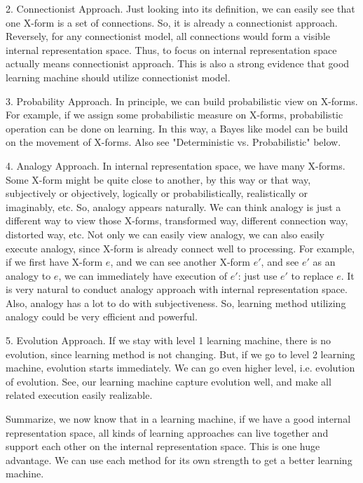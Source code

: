 2. Connectionist Approach.
Just looking into its definition, we can easily see that one X-form is a set of connections. So, it is already a connectionist approach. Reversely, for any connectionist model, all connections would form a visible internal representation space. Thus, to focus on internal representation space actually means connectionist approach. This is also a strong evidence that good learning machine should utilize connectionist model.

3. Probability Approach.
In principle, we can build probabilistic view on X-forms. For example, if we assign some probabilistic measure on X-forms, probabilistic operation can be done on learning. 
In this way, a Bayes like model can be build on the movement of X-forms. Also see "Deterministic vs. Probabilistic" below.

4. Analogy Approach. 
In internal representation space, we have many X-forms. Some X-form might be quite close to another, by this way or that way, subjectively or objectively, logically or probabilistically, realistically or imaginably, etc. So, analogy appears naturally. We can think analogy is just a different way to view those X-forms, transformed way, different connection way, distorted way, etc. Not only we can easily view analogy, we can also easily execute analogy, since X-form is already connect well to processing. For example, if we first have X-form $e$, and we can see another X-form $e'$, and see $e'$ as an analogy to $e$, we can immediately have execution of $e'$: just use $e'$ to replace $e$. It is very natural to conduct analogy approach with internal representation space. Also, analogy has a lot to do with subjectiveness. So, learning method utilizing analogy could be very efficient and powerful.

5. Evolution Approach.
If we stay with level 1 learning machine, there is no evolution, since learning method is not changing. But, if we go to level 2 learning machine, evolution starts immediately. We can go even higher level, i.e. evolution of evolution. See, our learning machine capture evolution well, and make all related execution easily realizable. 

Summarize, we now know that in a learning machine, if we have a good internal representation space, all kinds of learning approaches can live together and support each other on the internal representation space. This is one huge advantage. We can use each method for its own strength to get a better learning machine.
\bigskip


